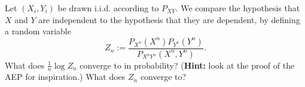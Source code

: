 \documentclass[a4paper,10pt,landscape,twocolumn]{scrartcl}
\begin{document}
\begin{exercise}[Independence?]
	Let $(X_i,Y_i)$ be drawn i.i.d. according to $P_{XY}$. We compare the hypothesis that $X$ and $Y$ are independent to the hypothesis that they are dependent, by defining a random variable
	\[
	Z_n := \frac{P_{X^n}({X^n})P_{Y^n}(Y^n)}{P_{X^nY^n}(X^n,Y^n)}.
	\]
	What does $\frac{1}{n} \log Z_n$ converge to in probability? (\textbf{Hint:} look at the proof of the AEP for inspiration.) What does $Z_n$ converge to?
\end{exercise}
\end{document}
